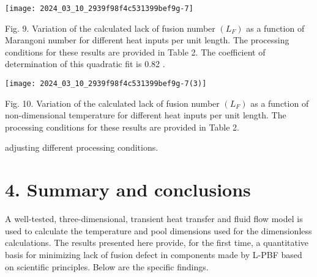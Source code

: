 \documentclass[10pt]{article}
\begin{document}
\begin{center}
\texttt{[image: 2024\_03\_10\_2939f98f4c531399bef9g-7]}
\end{center}

Fig. 9. Variation of the calculated lack of fusion number $\left(L_{F}\right)$ as a function of Marangoni number for different heat inputs per unit length. The processing conditions for these results are provided in Table 2. The coefficient of determination of this quadratic fit is 0.82 .

\begin{center}
\texttt{[image: 2024\_03\_10\_2939f98f4c531399bef9g-7(3)]}
\end{center}

Fig. 10. Variation of the calculated lack of fusion number $\left(L_{F}\right)$ as a function of non-dimensional temperature for different heat inputs per unit length. The processing conditions for these results are provided in Table 2.

adjusting different processing conditions.

\section*{4. Summary and conclusions}
A well-tested, three-dimensional, transient heat transfer and fluid flow model is used to calculate the temperature and pool dimensions used for the dimensionless calculations. The results presented here provide, for the first time, a quantitative basis for minimizing lack of fusion defect in components made by L-PBF based on scientific principles. Below are the specific findings.
\end{document}
